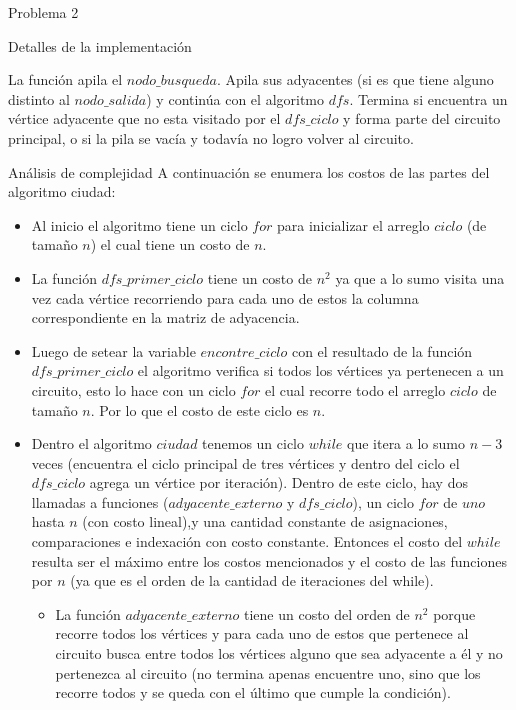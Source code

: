 \begin{section}{Problema 2}
\begin{subsection}{Detalles de la implementación}
\begin{itemize}
			La función apila el $nodo\_busqueda$. Apila sus adyacentes (si es que tiene alguno distinto al $nodo\_salida$) y continúa con el algoritmo $dfs$. Termina si encuentra un vértice adyacente que no esta visitado por el $dfs\_ciclo$ y forma parte del circuito principal, o si la pila se vacía y todavía no logro volver al circuito.
		\end{itemize}
	\end{subsection}


	\begin{subsection}{Análisis de complejidad}
		A continuación se enumera los costos de las partes del algoritmo ciudad:

		\begin{itemize}
		\item Al inicio el algoritmo tiene un ciclo $for$ para inicializar el arreglo $ciclo$ (de tamaño $n$) el cual tiene un costo de $n$.
		
		\item La función $dfs\_primer\_ciclo$ tiene un costo de $n^2$ ya que a lo sumo visita una vez cada vértice recorriendo para cada uno de estos la columna correspondiente en la matriz de adyacencia.
	
		\item Luego de setear la variable $encontre\_ciclo$ con el resultado de la función $dfs\_primer\_ciclo$ el algoritmo verifica si todos los vértices ya pertenecen a un circuito, esto lo hace con un ciclo $for$ el cual recorre todo el arreglo $ciclo$ de tamaño $n$. Por lo que el costo de este ciclo es $n$.

		\item Dentro el algoritmo $ciudad$ tenemos un ciclo $while$ que itera a lo sumo $n-3$ veces (encuentra el ciclo principal de tres vértices y dentro del ciclo el $dfs\_ciclo$ agrega un vértice por iteración). Dentro de este ciclo, hay dos llamadas a funciones ($adyacente\_externo$ y $dfs\_ciclo$), un ciclo $for$ de $uno$ hasta $n$ (con costo lineal),y una cantidad constante de asignaciones, comparaciones e indexación con costo constante. Entonces el costo del $while$ resulta ser el máximo entre los costos mencionados y el costo de las funciones por $n$ (ya que es el orden de la cantidad de iteraciones del while).
				
			\begin{itemize}
			\item La función $adyacente\_externo$ tiene un costo del orden de $n^2$ porque recorre todos los vértices y para cada uno de estos que pertenece al circuito busca entre todos los vértices alguno que sea adyacente a él y no pertenezca al circuito (no termina apenas encuentre uno, sino que los recorre todos y se queda con el último que cumple la condición).
	

\end{itemize}
\end{itemize}
\end{subsection}
\end{section}
